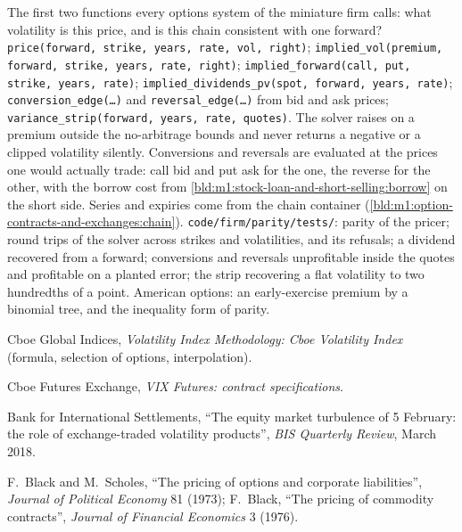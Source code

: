 \begin{build}
 The first two functions every options system of the
miniature firm calls: what volatility is this price, and is this chain
consistent with one forward?
 \texttt{price(forward, strike, years, rate, vol, right)};
\texttt{implied\_vol(premium, forward, strike, years, rate, right)};
\texttt{implied\_forward(call, put, strike, years, rate)};
\texttt{implied\_dividends\_pv(spot, forward, years, rate)};
\texttt{conversion\_edge(\ldots)} and \texttt{reversal\_edge(\ldots)} from bid
and ask prices; \texttt{variance\_strip(forward, years, rate, quotes)}.
 The solver raises on a premium outside the no-arbitrage
bounds and never returns a negative or a clipped volatility silently.
Conversions and reversals are evaluated at the prices one would actually
trade: call bid and put ask for the one, the reverse for the other, with the
borrow cost from \cref{bld:m1:stock-loan-and-short-selling:borrow} on the
short side. Series and expiries come from the chain container
(\cref{bld:m1:option-contracts-and-exchanges:chain}).
 \texttt{code/firm/parity/tests/}: parity of the
pricer; round trips of the solver across strikes and volatilities, and its
refusals; a dividend recovered from a forward; conversions and reversals
unprofitable inside the quotes and profitable on a planted error; the strip
recovering a flat volatility to two hundredths of a point.
 American options: an early-exercise premium by a binomial
tree, and the inequality form of parity.
\end{build}

\begin{omsources}
\item Cboe Global Indices, \emph{Volatility Index Methodology: Cboe
Volatility Index} (formula, selection of options, interpolation).
\item Cboe Futures Exchange, \emph{VIX Futures: contract specifications}.
\item Bank for International Settlements, ``The equity market turbulence of 5
February: the role of exchange-traded volatility products'', \emph{BIS
Quarterly Review}, March 2018.
\item F.~Black and M.~Scholes, ``The pricing of options and corporate
liabilities'', \emph{Journal of Political Economy} 81 (1973); F.~Black,
``The pricing of commodity contracts'', \emph{Journal of Financial Economics}
3 (1976).
\end{omsources}

